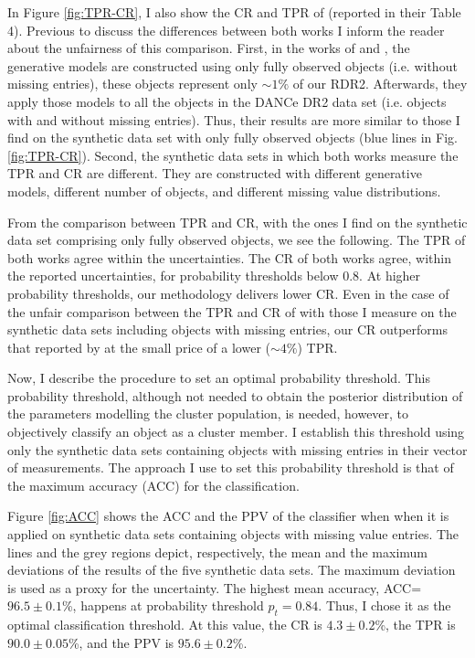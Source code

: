 In Figure \ref{fig:TPR-CR}, I also show the CR and TPR of \citet{Sarro2014} (reported in their Table 4). Previous to discuss the differences between both works I inform the reader about the unfairness of this comparison. First, in the works of \citet{Sarro2014} and \citet{Bouy2015}, the generative models are constructed using only fully observed objects (i.e. without missing entries), these objects represent only  $\sim 1\%$ of our RDR2. Afterwards, they apply those models to all the objects in the DANCe DR2 data set (i.e. objects with and without missing entries). Thus, their results are more similar to those I find on the synthetic data set with only fully observed objects (blue lines in Fig. \ref{fig:TPR-CR}). Second, the synthetic data sets in which both works measure the TPR and CR are different. They are constructed with different generative models, different number of objects, and different missing value distributions.

From the comparison between \citet{Sarro2014} TPR and CR, with the ones I find on the synthetic data set comprising only fully observed objects, we see the following. The TPR of both works agree within the uncertainties. The CR of both works agree, within the reported uncertainties, for probability thresholds below 0.8. At higher probability thresholds, our methodology delivers lower CR. Even in the case of the unfair comparison between the TPR and CR of \citet{Sarro2014} with those I measure on the synthetic data sets including objects with missing entries, our CR outperforms that reported by \citet{Sarro2014} at the small price of a lower ($\sim 4\%$) TPR.

Now, I describe the procedure to set an optimal probability threshold. This probability threshold, although not needed to obtain the posterior distribution of the parameters modelling the cluster population, is needed, however, to objectively classify an object as a cluster member. I establish this threshold using only the synthetic data sets containing objects with missing entries in their vector of measurements.  The approach I use to set this probability threshold is that of the maximum accuracy (ACC) for the classification. 

Figure \ref{fig:ACC} shows the ACC and the PPV of the classifier when when it is applied on synthetic data sets containing objects with missing value entries. The lines and the grey regions depict, respectively, the mean and the maximum deviations of the results of the five synthetic data sets. The maximum deviation is used as a proxy for the uncertainty. The highest mean accuracy, ACC=$96.5\pm0.1$\%, happens at probability threshold $p_t = 0.84$. Thus, I chose it as the optimal classification threshold. At this value, the CR is $4.3\pm0.2$\%, the TPR is $90.0\pm0.05$\%, and the PPV is $95.6\pm0.2$\%. 

